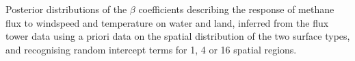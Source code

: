 \label{fig:Beta_Fch4_byS0S04S16_Stor} Posterior distributions
of the \(\beta\) coefficients describing the response of methane flux to
windspeed and temperature on water and land, inferred from the flux
tower data using a priori data on the spatial distribution of the two
surface types, and recognising random intercept terms for 1, 4 or 16
spatial regions.